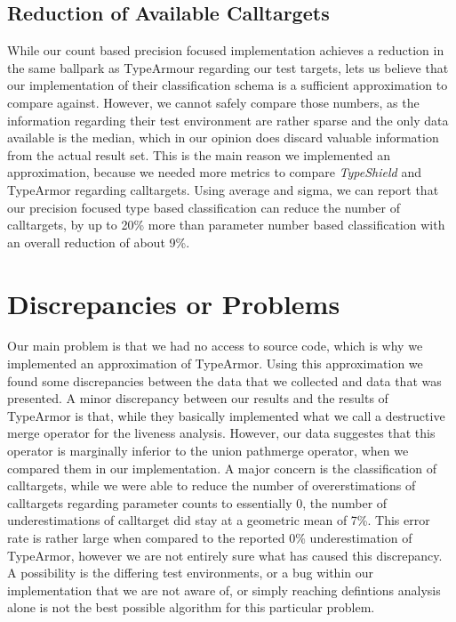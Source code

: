 \subsection{Reduction of Available Calltargets}
While our count based precision focused implementation achieves a reduction in the same ballpark as TypeArmour regarding our test targets, lets us believe that our implementation of their classification schema is a sufficient approximation to compare against. However, we cannot safely compare those numbers, as the information regarding their test environment are rather sparse and the only data available is the median, which in our opinion does discard valuable information from the actual result set. This is the main reason we implemented an approximation, because we needed more metrics to compare \textit{TypeShield} and TypeArmor regarding calltargets. Using average and sigma, we can report that our precision focused type based classification can reduce the number of calltargets, by up to 20\% more than parameter number based classification with an overall reduction of about 9\%.


\section{Discrepancies or Problems}
\label{section:discrep}
Our main problem is that we had no access to source code, which is why we implemented an approximation of TypeArmor. Using this approximation we found some discrepancies between the data that we collected and data that was presented.
A minor discrepancy between our results and the results of TypeArmor is that, while they basically implemented what we call a destructive merge operator for the liveness analysis. However, our data suggestes that this operator is marginally inferior to the union pathmerge operator, when we compared them in our implementation.
A major concern is the classification of calltargets, while we were able to reduce the number of overerstimations of calltargets regarding parameter counts to essentially 0, the number of underestimations of calltarget did stay at a geometric mean of 7\%. This error rate is rather large when compared to the reported 0\% underestimation of TypeArmor, however we are not entirely sure what has caused this discrepancy. A possibility is the differing test environments, or a bug within our implementation that we are not aware of, or simply reaching defintions analysis alone is not the best possible algorithm for this particular problem.

